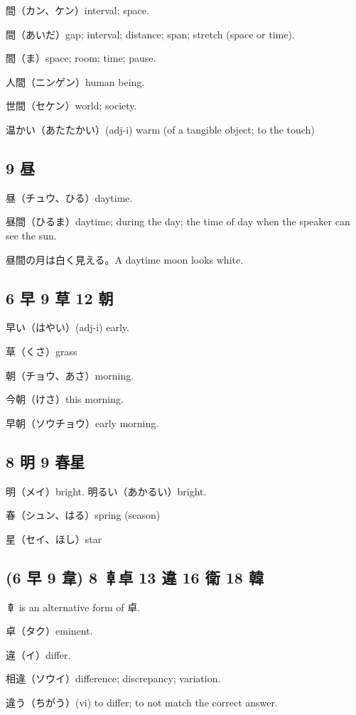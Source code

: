間（カン、ケン）interval; space.

間（あいだ）gap; interval; distance; span; stretch (space or time).

間（ま）space; room; time; pause.

人間（ニンゲン）human being.

世間（セケン）world; society.

温かい（あたたかい）(adj-i) warm (of a tangible object; to the touch)

\subsection{9 昼}

昼（チュウ、ひる）daytime.

昼間（ひるま）daytime; during the day;
the time of day when the speaker can see the sun.

昼間の月は白く見える。A daytime moon looks white.

\subsection{6 早 9 草 12 朝}

早い（はやい）(adj-i) early.

草（くさ）grass

朝（チョウ、あさ）morning.

今朝（けさ）this morning.

早朝（ソウチョウ）early morning.

\subsection{8 明 9 春星}

明（メイ）bright.
明るい（あかるい）bright.

春（シュン、はる）spring (season)

星（セイ、ほし）star

\subsection{(6 早 9 韋) 8 𠦝卓 13 違 16 衛 18 韓}

𠦝 is an alternative form of 卓.

卓（タク）eminent.

違（イ）differ.

相違（ソウイ）difference; discrepancy; variation.

違う（ちがう）(vi) to differ; to not match the correct answer.

